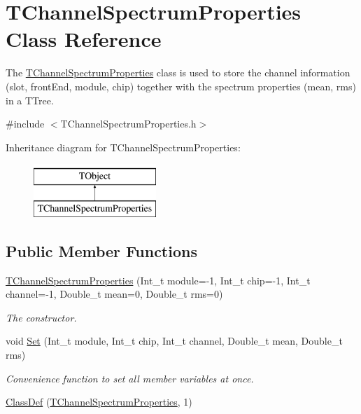 \hypertarget{class_t_channel_spectrum_properties}{\section{T\-Channel\-Spectrum\-Properties Class Reference}
\label{class_t_channel_spectrum_properties}
}


The \hyperlink{class_t_channel_spectrum_properties}{T\-Channel\-Spectrum\-Properties} class is used to store the channel information (slot, front\-End, module, chip) together with the spectrum properties (mean, rms) in a T\-Tree.  




{\ttfamily \#include $<$T\-Channel\-Spectrum\-Properties.\-h$>$}

Inheritance diagram for T\-Channel\-Spectrum\-Properties\-:\begin{figure}[H]
\begin{center}
\leavevmode
\includegraphics[height=2.000000cm]{class_t_channel_spectrum_properties}
\end{center}
\end{figure}
\subsection*{Public Member Functions}
\begin{DoxyCompactItemize}
\item 
\hyperlink{class_t_channel_spectrum_properties_ac1d3286952893fa565cbfd8227e84ff3}{T\-Channel\-Spectrum\-Properties} (Int\-\_\-t module=-\/1, Int\-\_\-t chip=-\/1, Int\-\_\-t channel=-\/1, Double\-\_\-t mean=0, Double\-\_\-t rms=0)
\begin{DoxyCompactList}\small\item\em The constructor. \end{DoxyCompactList}\item 
void \hyperlink{class_t_channel_spectrum_properties_a3ddfb6dfbbed5b502f1ddf5a40c387ba}{Set} (Int\-\_\-t module, Int\-\_\-t chip, Int\-\_\-t channel, Double\-\_\-t mean, Double\-\_\-t rms)
\begin{DoxyCompactList}\small\item\em Convenience function to set all member variables at once. \end{DoxyCompactList}\item 
\hyperlink{class_t_channel_spectrum_properties_a4b92e78edcf807e0353d5b059c55aa9c}{Class\-Def} (\hyperlink{class_t_channel_spectrum_properties}{T\-Channel\-Spectrum\-Properties}, 1)
\end{DoxyCompactItemize}
